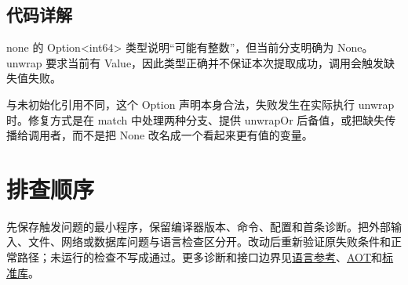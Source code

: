 \subsection*{代码详解}

none 的 Option<int64> 类型说明“可能有整数”，但当前分支明确为 None。unwrap 要求当前有 Value，因此类型正确并不保证本次提取成功，调用会触发缺失值失败。

与未初始化引用不同，这个 Option 声明本身合法，失败发生在实际执行 unwrap 时。修复方式是在 match 中处理两种分支、提供 unwrapOr 后备值，或把缺失传播给调用者，而不是把 None 改名成一个看起来更有值的变量。

\section{排查顺序}

先保存触发问题的最小程序，保留编译器版本、命令、配置和首条诊断。把外部输入、文件、网络或数据库问题与语言检查区分开。改动后重新验证原失败条件和正常路径；未运行的检查不写成通过。更多诊断和接口边界见\href{https://github.com/rabbitc999/ChaLi/blob/master/doc/04-language-reference.md}{语言参考}、\href{https://github.com/rabbitc999/ChaLi/blob/master/doc/38-aot.md}{AOT}和\href{https://github.com/rabbitc999/ChaLi/blob/master/doc/library/README.md}{标准库}。

